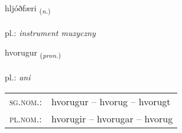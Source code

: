 \documentclass[frontgrid, backgrid]{flacards}\usepackage[]{graphicx}\usepackage[]{xcolor}
\begin{document}
\renewcommand{\flhead}{\vskip5pt \fboxsep=0pt {\small\bfseries\footnotesize Nafnorð | rzeczownik}}
\renewcommand{\fcfoot}{\vskip5pt \fboxsep=0pt \hspace{2pt}{\small\bfseries\footnotesize 3K}}

\renewcommand{\blhead}{\vskip5pt {\small\bfseries\footnotesize Nafnorð | rzeczownik }}
\renewcommand{\bcfoot}{\vskip5pt \hspace{2pt}{\small\bfseries\footnotesize 3K}}


{hljóðfæri \small{\textsubscript{(\textit{n.})}} \\[1ex] %
\textphonetic{[l̥jouðfairɪ]} \\
pl.: \emph{instrument muzyczny} \\  [2ex]
\renewcommand*{\arraystretch}{0.8}
}

\renewcommand{\flhead}{\vskip5pt \fboxsep=0pt {\small\bfseries\footnotesize Fornafn | zaimek}}
\renewcommand{\fcfoot}{\vskip5pt \fboxsep=0pt \hspace{2pt}{\small\bfseries\footnotesize 3K}}

\renewcommand{\blhead}{\vskip5pt {\small\bfseries\footnotesize Fornafn | zaimek }}
\renewcommand{\bcfoot}{\vskip5pt \hspace{2pt}{\small\bfseries\footnotesize 3K}}


{hvorugur \small{\textsubscript{(\textit{pron.})}} \\[1ex] %
\textphonetic{[kʰvɔːrʏɣʏr]} \\
pl.: \emph{ani} \\  [2ex]
\renewcommand*{\arraystretch}{0.8}
\begin{tabular}{ll}
\textsc{sg.nom.}: & hvorugur  --  hvorug -- hvorugt \\ 
\textsc{pl.nom.}: & hvorugir -- hvorugar -- hvorug
\end{tabular}
}
\end{document}
